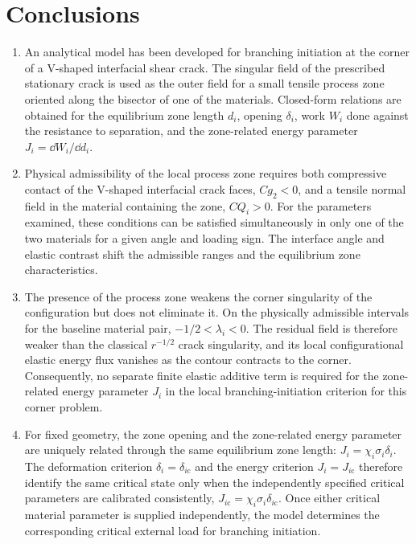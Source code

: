 \section{Conclusions}
\label{sec:conclusions}

\begin{enumerate}
\item
An analytical model has been developed for branching initiation at the
corner of a V-shaped interfacial shear crack. The singular field of the
prescribed stationary crack is used as the outer field for a small tensile
process zone oriented along the bisector of one of the materials.
Closed-form relations are obtained for the equilibrium zone length $d_i$,
opening $\delta_i$, work $W_i$ done against the resistance to separation,
and the zone-related energy parameter $J_i=\dd W_i/\dd d_i$.

\item
Physical admissibility of the local process zone requires both compressive
contact of the V-shaped interfacial crack faces, $Cg_2<0$, and a tensile
normal field in the material containing the zone, $CQ_i>0$. For the
parameters examined, these conditions can be satisfied simultaneously in
only one of the two materials for a given angle and loading sign. The
interface angle and elastic contrast shift the admissible ranges and the
equilibrium zone characteristics.

\item
The presence of the process zone weakens the corner singularity of the
configuration but does not eliminate it. On the physically admissible intervals for the baseline
material pair, $-1/2<\lambda_i<0$. The residual field is therefore weaker
than the classical $r^{-1/2}$ crack singularity, and its local
configurational elastic energy flux vanishes as the contour contracts to
the corner. Consequently, no separate finite elastic additive term is required for the
zone-related energy parameter $J_i$ in the local branching-initiation
criterion for this corner problem.

\item
For fixed geometry, the zone opening and the zone-related energy parameter
are uniquely related through the same equilibrium zone length:
$J_i=\chi_i\sigma_i\delta_i$. The deformation criterion
$\delta_i=\delta_{i\mathrm{c}}$ and the energy criterion
$J_i=J_{i\mathrm{c}}$ therefore identify the same critical state only
when the independently specified critical parameters are calibrated
consistently,
$J_{i\mathrm{c}}=\chi_i\sigma_i\delta_{i\mathrm{c}}$. Once either
critical material parameter is supplied independently, the model determines
the corresponding critical external load for branching initiation.


\end{enumerate}
